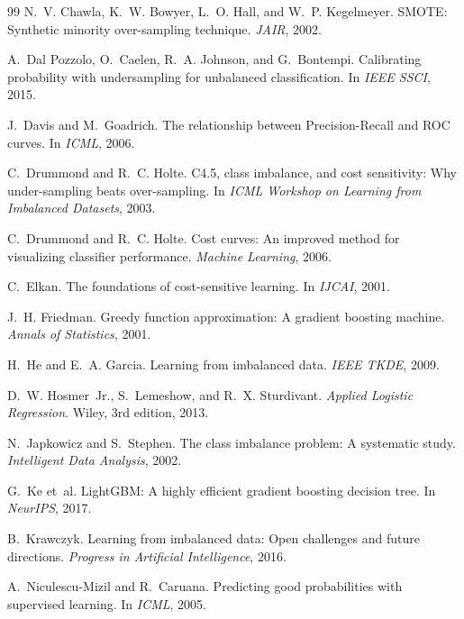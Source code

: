 \documentclass[10pt,twocolumn,letterpaper]{article}
\begin{document}
\begin{thebibliography}{99}
N.~V. Chawla, K.~W. Bowyer, L.~O. Hall, and W.~P. Kegelmeyer.
\newblock SMOTE: Synthetic minority over-sampling technique.
\newblock \emph{JAIR}, 2002.

A.~Dal Pozzolo, O.~Caelen, R.~A. Johnson, and G.~Bontempi.
\newblock Calibrating probability with undersampling for unbalanced classification.
\newblock In \emph{IEEE SSCI}, 2015.

J.~Davis and M.~Goadrich.
\newblock The relationship between Precision-Recall and ROC curves.
\newblock In \emph{ICML}, 2006.

C.~Drummond and R.~C. Holte.
\newblock C4.5, class imbalance, and cost sensitivity: Why under-sampling beats over-sampling.
\newblock In \emph{ICML Workshop on Learning from Imbalanced Datasets}, 2003.

C.~Drummond and R.~C. Holte.
\newblock Cost curves: An improved method for visualizing classifier performance.
\newblock \emph{Machine Learning}, 2006.

C.~Elkan.
\newblock The foundations of cost-sensitive learning.
\newblock In \emph{IJCAI}, 2001.

J.~H. Friedman.
\newblock Greedy function approximation: A gradient boosting machine.
\newblock \emph{Annals of Statistics}, 2001.

H.~He and E.~A. Garcia.
\newblock Learning from imbalanced data.
\newblock \emph{IEEE TKDE}, 2009.

D.~W. Hosmer~Jr., S.~Lemeshow, and R.~X. Sturdivant.
\newblock \emph{Applied Logistic Regression}.
\newblock Wiley, 3rd edition, 2013.

N.~Japkowicz and S.~Stephen.
\newblock The class imbalance problem: A systematic study.
\newblock \emph{Intelligent Data Analysis}, 2002.

G.~Ke et~al.
\newblock LightGBM: A highly efficient gradient boosting decision tree.
\newblock In \emph{NeurIPS}, 2017.

B.~Krawczyk.
\newblock Learning from imbalanced data: Open challenges and future directions.
\newblock \emph{Progress in Artificial Intelligence}, 2016.

A.~Niculescu-Mizil and R.~Caruana.
\newblock Predicting good probabilities with supervised learning.
\newblock In \emph{ICML}, 2005.


\end{thebibliography}
\end{document}
